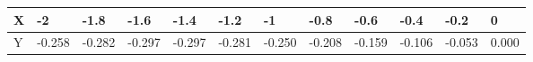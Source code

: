 \begin{longtable}[c]{|l|l|l|l|l|l|l|l|l|l|l|l|}
\hline
X & -2     & -1.8   & -1.6   & -1.4   & -1.2   & -1     & -0.8   & -0.6   & -0.4   & -0.2   & 0     \\ \hline
\endfirsthead
%
\endhead
%
Y & -0.258 & -0.282 & -0.297 & -0.297 & -0.281 & -0.250 & -0.208 & -0.159 & -0.106 & -0.053 & 0.000 \\ \hline
\end{longtable}